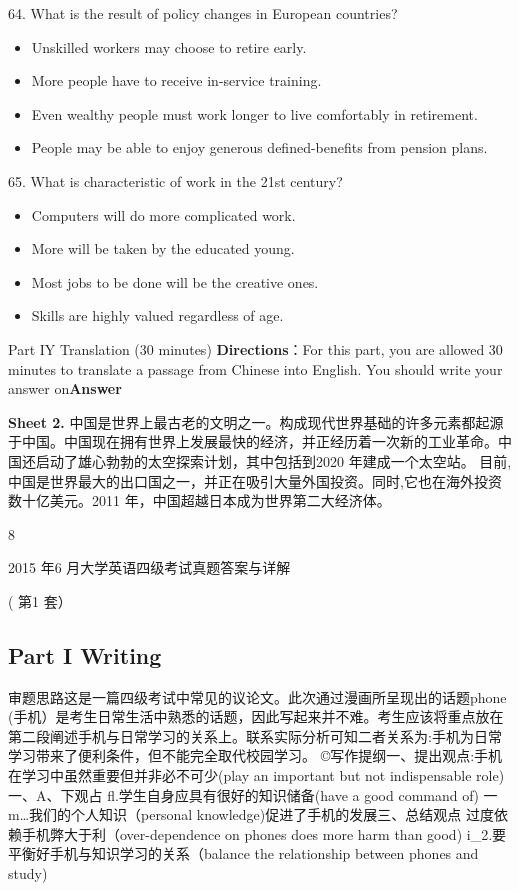 \documentclass[UTF8,11pt]{ctexart}
\begin{document}
64. What is the result of policy changes in European countries?


\begin{itemize}[leftmargin=2em,itemsep=.2em,topsep=.4em]\item[A.] Unskilled workers may choose to retire early.
\item[B.] More people have to receive in-service training.
\item[C.] Even wealthy people must work longer to live comfortably in retirement.
\item[D.] People may be able to enjoy generous defined-benefits from pension plans.
\end{itemize}

65. What is characteristic of work in the 21st century?


\begin{itemize}[leftmargin=2em,itemsep=.2em,topsep=.4em]\item[A.] Computers will do more complicated work.
\item[B.] More will be taken by the educated young.
\item[C.] Most jobs to be done will be the creative ones.
\item[D.] Skills are highly valued regardless of age.
\end{itemize}

Part IY Translation (30 minutes) \textbf{Directions}：For this part, you are allowed 30 minutes to translate a passage from Chinese into English. You should write your answer on\textbf{Answer}


\textbf{Sheet 2.} 中国是世界上最古老的文明之一。构成现代世界基础的许多元素都起源于中国。中国现在拥有世界上发展最快的经济，并正经历着一次新的工业革命。中国还启动了雄心勃勃的太空探索计划，其中包括到2020 年建成一个太空站。 目前,中国是世界最大的出口国之一，并正在吸引大量外国投资。同时,它也在海外投资数十亿美元。2011 年，中国超越日本成为世界第二大经济体。


8


2015 年6 月大学英语四级考试真题答案与详解


( 第1 套）


\subsection*{Part I Writing}


审题思路这是一篇四级考试中常见的议论文。此次通过漫画所呈现出的话题phone (手机）是考生日常生活中熟悉的话题，因此写起来并不难。考生应该将重点放在第二段阐述手机与日常学习的关系上。联系实际分析可知二者关系为:手机为日常学习带来了便利条件，但不能完全取代校园学习。 ©写作提纲一、提出观点:手机在学习中虽然重要但并非必不可少(play an important but not indispensable role) 一、A、下观占 fl.学生自身应具有很好的知识储备(have a good command of) 一m…我们的个人知识（personal knowledge)促进了手机的发展三、总结观点 过度依赖手机弊大于利（over-dependence on phones does more harm than good) i\_2.要平衡好手机与知识学习的关系（balance the relationship between phones and study) 
\end{document}
